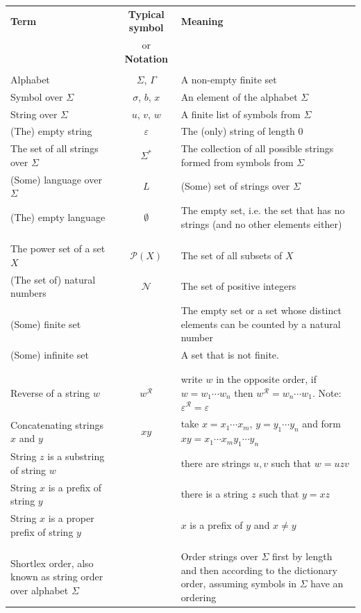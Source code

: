\documentclass[12pt, oneside]{article}
\begin{document}
\begin{center}
    \begin{tabular}{|p{2.6in}cp{3.5in}|}
    \hline 
    {\bf Term} & {\bf Typical symbol} & {\bf Meaning} \\
     & or {\bf Notation} & \\
    \hline
    && \\
    Alphabet & $\Sigma$, $\Gamma$ & A non-empty finite set	 \\
    Symbol over $\Sigma$  & $\sigma$, $b$, $x$ & An element of the alphabet $\Sigma$\\ 
    String over $\Sigma$  &	$u$, $v$, $w$ & A finite list of symbols from $\Sigma$\\
    (The) empty string &$\varepsilon$ & The (only) string of length $0$\\
    The set of all strings over $\Sigma$ & $\Sigma^*$ & The collection of all possible strings formed from symbols from $\Sigma$ \\ 
    (Some) language over $\Sigma$& $L$ & (Some) set of strings over $\Sigma$ \\ 
    (The) empty language &$\emptyset$ & The empty set, i.e. the set that has no strings (and no other elements either)\\
    && \\
    \hline
    && \\
    The power set of a set $X$ &$\mathcal{P}(X)$ & The set of all subsets of $X$ \\
    (The set of) natural numbers &$\mathcal{N}$ & The set of positive integers \\ 
    (Some) finite set & & The empty set or a set whose distinct elements can be counted by a natural number\\
    (Some) infinite set & & A set that is not finite.\\ 
    &&\\
    \hline
    && \\
    Reverse of a string $w$ & $w^\mathcal{R}$  & write $w$  in  the opposite order, if $w = w_1 \cdots  w_n$ then $w^\mathcal{R} = w_n \cdots  w_1$. Note: $\varepsilon^\mathcal{R} = \varepsilon$\\
    Concatenating strings $x$ and $y$ & $xy$ &  take $x = x_1 \cdots x_m$, $y=y_1 \cdots y_n$ and form $xy = x_1 \cdots x_m y_1 \cdots y_n$\\
    String $z$ is a substring of string $w$ & & there are strings $u,v$ such that $w = uzv$\\
    String $x$ is a prefix of string $y$ & & there is a string $z$ such that $y = xz$ \\
    String $x$ is a proper prefix of string $y$ & & $x$ is a prefix of $y$ and $x \neq y$\\
    && \\
    \hline
    &&\\
    Shortlex order, also known as string order over alphabet $\Sigma$ & & Order strings over  $\Sigma$ first 
    by length and then according to the dictionary order, assuming symbols in $\Sigma$  have an ordering\\ \hline
    \end{tabular}
\end{center}
\end{document}
